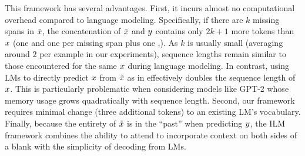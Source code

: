 This framework has several advantages.
First, it incurs almost no computational overhead compared to language modeling. 
Specifically, if there are $k$ missing spans in $\tilde{x}$, 
the concatenation of $\tilde{x}$ and $y$ contains only $2k+1$ more tokens than $x$ (one \blank{} and one \answer{} per missing span plus one \sep{}).
As $k$ is usually small (averaging around $2$ per example in our experiments), 
sequence lengths remain similar to those encountered for the same $x$ during language modeling. 
In contrast, using LMs to directly predict $x$ from $\tilde{x}$ as in \citet{fedus2018maskgan} effectively doubles the sequence length of $x$. 
This is particularly problematic when considering models like GPT-2 whose memory usage grows quadratically with sequence length. 
Second, our framework requires minimal change (three additional tokens) to an existing LM's vocabulary.
Finally, because the entirety of $\tilde{x}$ is in the ``past'' when predicting $y$, the ILM framework combines the ability to attend to incorporate context on both sides of a blank with the simplicity of decoding from LMs. 